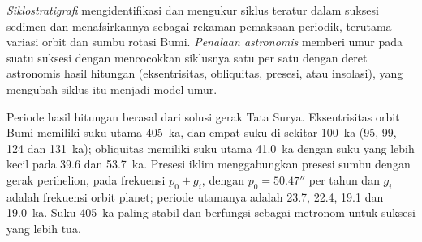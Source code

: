 \begin{definition}\label{def:b3:sequence-stratigraphy:cyclo}
\emph{Siklostratigrafi} mengidentifikasi dan mengukur
siklus teratur dalam suksesi sedimen dan menafsirkannya sebagai rekaman
pemaksaan periodik, terutama variasi orbit dan sumbu rotasi Bumi.
\emph{Penalaan astronomis} memberi umur pada suatu suksesi
dengan mencocokkan siklusnya satu per satu dengan deret astronomis hasil hitungan
(eksentrisitas, obliquitas, presesi, atau insolasi), yang mengubah
siklus itu menjadi model umur.
\end{definition}

Periode hasil hitungan berasal dari solusi gerak Tata Surya.
Eksentrisitas orbit Bumi memiliki suku utama \qty{405}{ka}, dan
empat suku di sekitar \qty{100}{ka} (95, 99, 124 dan \qty{131}{ka});
obliquitas memiliki suku utama \qty{41.0}{ka} dengan suku yang lebih kecil pada 39.6 dan
\qty{53.7}{ka}. Presesi iklim menggabungkan presesi sumbu
dengan gerak perihelion, pada frekuensi $p_0 + g_i$, dengan $p_0 =
50.47''$ per tahun dan $g_i$ adalah frekuensi orbit planet; periode utamanya
adalah 23.7, 22.4, 19.1 dan \qty{19.0}{ka}.
Suku \qty{405}{ka} paling stabil dan berfungsi sebagai metronom untuk suksesi yang lebih tua.

